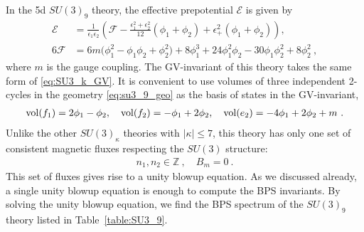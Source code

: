 In the 5d $SU(3)_9$ theory, the effective prepotential $\mathcal{E}$ is given by
\begin{align}\label{eq:su3_9_prepotential}
\mathcal{E} &= \frac{1}{\epsilon_1 \epsilon_2} 
\left( \mathcal{F} - \frac{\epsilon_1^2  + \epsilon_2^2}{12}(\phi_1 + \phi_2) +\epsilon_+^2 (\phi_1 + \phi_2) \right), \\ 
6 \mathcal{F} &=  6m\big(\phi_1^2 - \phi_1 \phi_2 + \phi_2^2\big) +8\phi_1^3 + 24\phi_1^2 \phi_2 - 30\phi_1 \phi_2^2 + 8\phi_2^2  \ , \nonumber 
\end{align}
where $m$ is the gauge coupling. The GV-invariant of this theory takes the same form of \eqref{eq:SU3_k_GV}. It is convenient to use volumes of three independent 2-cycles in the geometry \eqref{eq:su3_9_geo} as the basis of states in the GV-invariant,
\begin{align}\label{eq:su3_9_vol}
\operatorname{vol} (f_1) =  2\phi_1 - \phi_2, \quad
\operatorname{vol} (f_2) = -\phi_1 + 2\phi_2, \quad
\operatorname{vol} (e_2) = -4\phi_1 + 2\phi_2 + m\ .
\end{align}
Unlike the other $SU(3)_\kappa$ theories with $|\kappa|\le 7$, this theory has only one set of consistent magnetic fluxes respecting the $ SU(3) $ structure:
\begin{align}\label{eq:MFforSU3_9}
	n_1,n_2\in \mathbb{Z} \ , \quad B_m = 0 \ .
\end{align}
This set of fluxes gives rise to a unity blowup equation. As we discussed already, a single unity blowup equation is enough to compute the BPS invariants. By solving the unity blowup equation, we find the BPS spectrum of the $SU(3)_9$ theory listed in Table~\ref{table:SU3_9}.
